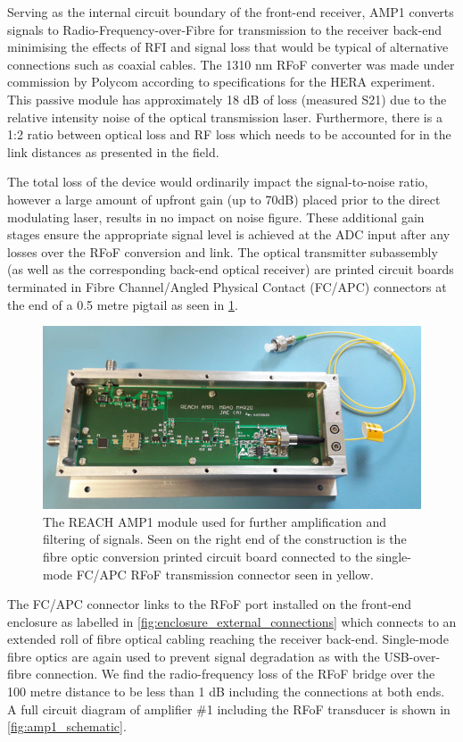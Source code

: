Serving as the internal circuit boundary of the front-end receiver, AMP1 converts signals to Radio-Frequency-over-Fibre for transmission to the receiver back-end minimising the effects of RFI and signal loss that would be typical of alternative connections such as coaxial cables. The 1310 nm RFoF converter was made under commission by Polycom according to specifications for the HERA experiment. This passive module has approximately 18 dB of loss (measured S21) due to the relative intensity noise of the optical transmission laser.  Furthermore, there is a 1:2 ratio between optical loss and RF loss which needs to be accounted for in the link distances as presented in the field.

The total loss of the device would ordinarily impact the signal-to-noise ratio, however a large amount of upfront gain (up to 70dB) placed prior to the direct modulating laser, results in no impact on noise figure. These additional gain stages ensure the appropriate signal level is achieved at the ADC input after any losses over the RFoF conversion and link. The optical transmitter subassembly (as well as the corresponding back-end optical receiver) are printed circuit boards terminated in Fibre Channel/Angled Physical Contact (FC/APC) connectors at the end of a 0.5 metre pigtail as seen in \cref{fig:amp1}.
\begin{figure}
    \centering
    \includegraphics[scale=0.5]{amp1}
    \caption{The REACH AMP1 module used for further amplification and filtering of signals. Seen on the right end of the construction is the fibre optic conversion printed circuit board connected to the single-mode FC/APC RFoF transmission connector seen in yellow.}
    \label{fig:amp1}
\end{figure}
The FC/APC connector links to the RFoF port installed on the front-end enclosure as labelled in \cref{fig:enclosure_external_connections} which connects to an extended roll of fibre optical cabling reaching the receiver back-end. Single-mode fibre optics are again used to prevent signal degradation as with the USB-over-fibre connection. We find the radio-frequency loss of the RFoF bridge over the 100 metre distance to be less than 1 dB including the connections at both ends. A full circuit diagram of amplifier \#1 including the RFoF transducer is shown in \cref{fig:amp1_schematic}.


